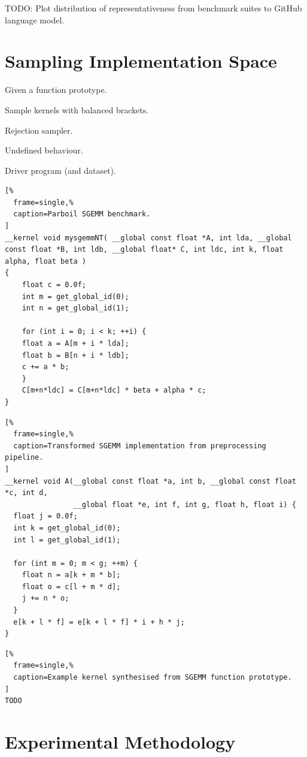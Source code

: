 \documentclass[preprint,nonatbib,10pt,nocopyrightspace]{sigplanconf}
\begin{document}
TODO: Plot distribution of representativeness from benchmark suites to
GitHub language model.


\section{Sampling Implementation Space}\label{sec:}

Given a function prototype.

Sample kernels with balanced brackets.

Rejection sampler.

Undefined behaviour.

Driver program (and dataset).

\lstset{language=[OpenCL]C}
\begin{lstlisting}[%
  frame=single,%
  caption=Parboil SGEMM benchmark.
]
__kernel void mysgemmNT( __global const float *A, int lda, __global const float *B, int ldb, __global float* C, int ldc, int k, float alpha, float beta )
{
    float c = 0.0f;
    int m = get_global_id(0);
    int n = get_global_id(1);

    for (int i = 0; i < k; ++i) {
	float a = A[m + i * lda];
	float b = B[n + i * ldb];
	c += a * b;
    }
    C[m+n*ldc] = C[m+n*ldc] * beta + alpha * c;
}
\end{lstlisting}


\lstset{language=[OpenCL]C}
\begin{lstlisting}[%
  frame=single,%
  caption=Transformed SGEMM implementation from preprocessing pipeline.
]
__kernel void A(__global const float *a, int b, __global const float *c, int d,
                __global float *e, int f, int g, float h, float i) {
  float j = 0.0f;
  int k = get_global_id(0);
  int l = get_global_id(1);

  for (int m = 0; m < g; ++m) {
    float n = a[k + m * b];
    float o = c[l + m * d];
    j += n * o;
  }
  e[k + l * f] = e[k + l * f] * i + h * j;
}
\end{lstlisting}


\lstset{language=[OpenCL]C}
\begin{lstlisting}[%
  frame=single,%
  caption=Example kernel synthesised from SGEMM function prototype.
]
TODO
\end{lstlisting}


\section{Experimental Methodology}\label{sec:evaluation}
\end{document}
